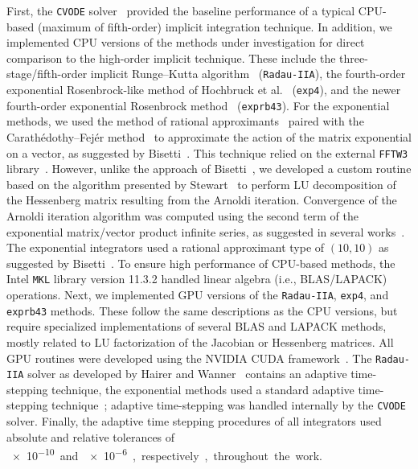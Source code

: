 \documentclass[preprint]{elsarticle}
\begin{document}
First, the \texttt{CVODE} solver~\cite{Hindmarsh:2005hg} provided the baseline performance of a typical CPU-based (maximum of fifth-order) implicit integration technique.
In addition, we implemented CPU versions of the methods under investigation for direct comparison to the high-order implicit technique.
These include the three-stage\slash fifth-order implicit Runge--Kutta algorithm~\cite{wanner1991solving} (\texttt{Radau-IIA}), the fourth-order exponential Rosenbrock-like method of Hochbruck et al.~\cite{Hochbruck:1998} (\texttt{exp4}), and the newer fourth-order exponential Rosenbrock method~\cite{Hockbruck:2009} (\texttt{exprb43}).
For the exponential methods, we used the method of rational approximants~\cite{gallopoulos:1992} paired with the Carath\'edothy--Fej\'er method~\cite{trefethen:2006} to approximate the action of the matrix exponential on a vector, as suggested by Bisetti~\cite{Bisetti:2012jw}.
This technique relied on the external \texttt{FFTW3} library~\cite{frigo2005design}.
However, unlike the approach of Bisetti~\cite{Bisetti:2012jw}, we developed a custom routine based on the algorithm presented by Stewart~\cite{stewart:1998} to perform LU decomposition of the Hessenberg matrix resulting from the Arnoldi iteration.
Convergence of the Arnoldi iteration algorithm was computed using the second term of the exponential matrix\slash vector product infinite series, as suggested in several works~\cite{Bisetti:2012jw,saad:1992}.
The exponential integrators used a rational approximant type of $\left(10,10\right)$ as suggested by Bisetti~\cite{Bisetti:2012jw}.
To ensure high performance of CPU-based methods, the Intel \texttt{MKL} library version 11.3.2 handled linear algebra (i.e., BLAS/LAPACK) operations.
Next, we implemented GPU versions of the \texttt{Radau-IIA}, \texttt{exp4}, and \texttt{exprb43} methods.
These follow the same descriptions as the CPU versions, but require specialized implementations of several BLAS and LAPACK methods, mostly related to LU factorization of the Jacobian or Hessenberg matrices.
All GPU routines were developed using the NVIDIA CUDA framework~\cite{Buck:2008aa,NVIDIA:2015aa}.
The \texttt{Radau-IIA} solver as developed by Hairer and Wanner~\cite{wanner1991solving} contains an adaptive time-stepping technique, the exponential methods used a standard adaptive time-stepping technique~\cite{wanner1991solving}; adaptive time-stepping was handled internally by the \texttt{CVODE} solver.
Finally, the adaptive time stepping procedures of all integrators used absolute and relative tolerances of \SI{e-10} and \SI{e-6}, respectively, throughout the work.
\end{document}
